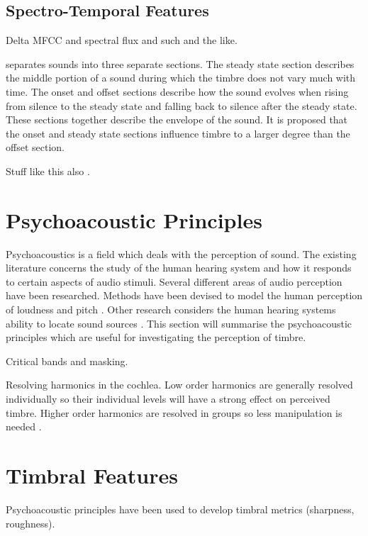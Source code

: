 	\subsection{Spectro-Temporal Features}
	\label{sec:Timbre-LowLevelFeatures-Spectrotemporal}
		\note
		{
			Delta MFCC and spectral flux and such and the like.
		}

	\citet{howard2009acoustics} separates sounds into three separate sections. The steady state section describes the
	middle portion of a sound during which the timbre does not vary much with time. The onset and offset sections
	describe how the sound evolves when rising from silence to the steady state and falling back to silence after the
	steady state. These sections together describe the envelope of the sound. It is proposed that the onset and steady
	state sections influence timbre to a larger degree than the offset section.

	\note
	{
		Stuff like this also \citep{freed1990auditory, lakatos2000a}.
	}
	
\section{Psychoacoustic Principles}
\label{sec:Timbre-PsychoacousticPrinciples}
	Psychoacoustics is a field which deals with the perception of sound. The existing literature concerns the study of
	the human hearing system and how it responds to certain aspects of audio stimuli. Several different areas of audio
	perception have been researched. Methods have been devised to model the human perception of loudness
	\citep{moore1997a} and pitch \citep{gerhard2003pitch}. Other research considers the human hearing systems ability to
	locate sound sources \citep{blauert1997spatial}. This section will summarise the psychoacoustic principles which are
	useful for investigating the perception of timbre. 

	\note
	{
		Critical bands and masking.

		Resolving harmonics in the cochlea. Low order harmonics are generally resolved individually so their
		individual levels will have a strong effect on perceived timbre. Higher order harmonics are resolved in
		groups so less manipulation is needed \citep{howard2009acoustics}.
	}

\section{Timbral Features}
\label{sec:Timbre-TimbralFeatures}
	\note
	{
		Psychoacoustic principles have been used to develop timbral metrics (sharpness, roughness).
	}

